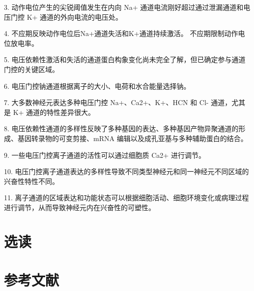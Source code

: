 3. 动作电位产生的尖锐阈值发生在内向 Na+ 通道电流刚好超过通过泄漏通道和电压门控 K+ 通道的外向电流的电压处。 


4. 不应期反映动作电位后Na+通道失活和K+通道持续激活。 
不应期限制动作电位放电率。 


5. 电压依赖性激活和失活的通道蛋白构象变化尚未完全了解，但已确定参与通道门控的关键区域。 


6. 电压门控钠通道根据离子的大小、电荷和水合能量选择钠。 


7. 大多数神经元表达多种电压门控 Na+、Ca2+、K+、HCN 和 Cl- 通道，尤其是 K+ 通道的特性差异很大。 


8. 电压依赖性通道的多样性反映了多种基因的表达、多种基因产物异聚通道的形成、基因转录物的可变剪接、mRNA 编辑以及成孔亚基与多种辅助蛋白的结合。 


9. 一些电压门控离子通道的活性可以通过细胞质 Ca2+ 进行调节。 


10. 电压门控离子通道表达的多样性导致不同类型神经元和同一神经元不同区域的兴奋性特性不同。 


11. 离子通道的区域表达和功能状态可以根据细胞活动、细胞环境变化或病理过程进行调节，从而导致神经元内在兴奋性的可塑性。


\section{选读}

\section{参考文献}

